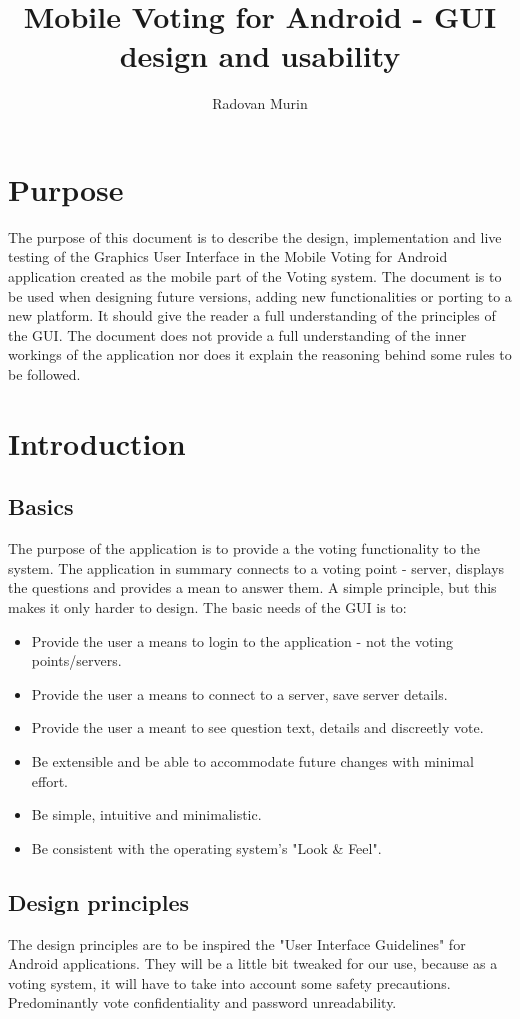 \documentclass[11pt]{article} %
\title{Mobile Voting for Android - GUI design and usability}
\author{Radovan Murin}
\begin{document}
\maketitle

\section{Purpose}

The purpose of this document is to describe the design, implementation and live testing of the Graphics User Interface in the Mobile Voting for Android application created as the mobile part of the Voting system. The document is to be used when designing future versions, adding new functionalities or porting to a new platform. It should give the reader a full understanding of the principles of the GUI. The document does not provide a full understanding of the inner workings of the application nor does it explain the reasoning behind some rules to be followed.

\section{Introduction}
\subsection{Basics}
The purpose of the application is to provide a the voting functionality to the system. The application in summary connects to a voting point - server, displays the questions and provides a mean to answer them. A simple principle, but this makes it only harder to design.
The basic needs of the GUI is to:
\begin{itemize}
\item Provide the user a means to login to the application - not the voting points/servers.
\item Provide the user a means to connect to a server, save server details.
\item Provide the user a meant to see question text, details and discreetly vote.
\item Be extensible and be able to accommodate future changes with minimal effort. 
\item Be simple, intuitive and minimalistic.
\item Be consistent with the operating system's "Look \& Feel".
\end{itemize}
\subsection{Design principles}
The design principles are to be inspired the "User Interface Guidelines" for Android applications\cite{uiGuidelines}. They will be a little bit tweaked for our use, because as a voting system, it will have to take into account some safety precautions. Predominantly vote confidentiality and password unreadability.
\end{document}

